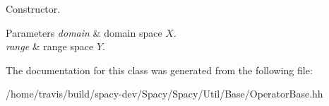 \-Constructor. 


\begin{DoxyParams}{\-Parameters}
{\em domain} & domain space $X$. \\
\hline
{\em range} & range space $Y$. \\
\hline
\end{DoxyParams}


\-The documentation for this class was generated from the following file\-:\begin{DoxyCompactItemize}
\item 
/home/travis/build/spacy-\/dev/\-Spacy/\-Spacy/\-Util/\-Base/\-Operator\-Base.\-hh\end{DoxyCompactItemize}
